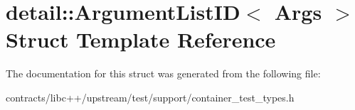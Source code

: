 \hypertarget{structdetail_1_1_argument_list_i_d}{}\section{detail\+:\+:Argument\+List\+ID$<$ Args $>$ Struct Template Reference}
\label{structdetail_1_1_argument_list_i_d}


The documentation for this struct was generated from the following file\+:\begin{DoxyCompactItemize}
\item 
contracts/libc++/upstream/test/support/container\+\_\+test\+\_\+types.\+h\end{DoxyCompactItemize}
